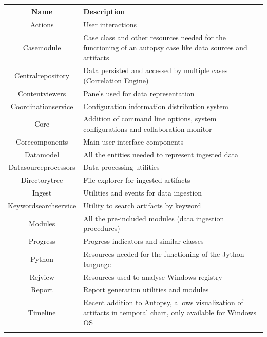 \begin{tabularx}{\textwidth}{@{}|c| *1{>{\centering\arraybackslash}X}@{}|}
    \hline
    \textbf{Name} & \textbf{Description} \\
    \hline\hline
    Actions & User interactions  \\
    \hline
    Casemodule & Case class and other resources needed for the functioning of an autopsy case like data sources and artifacts \\
    \hline
    Centralrepository & Data persisted and accessed by multiple cases (Correlation Engine) \\
    \hline
    Contentviewers & Panels used for data representation  \\
    \hline
    Coordinationservice & Configuration information distribution system \\
    \hline
    Core & Addition of command line options, system configurations and collaboration monitor  \\
    \hline
    Corecomponents & Main user interface components \\
    \hline
    Datamodel & All the entities needed to represent ingested data \\
    \hline
    Datasourceprocessors & Data processing utilities  \\
    \hline
    Directorytree & File explorer for ingested artifacts \\
    \hline
    Ingest & Utilities and events for data ingestion  \\
    \hline
    Keywordsearchservice & Utility to search artifacts by keyword  \\
    \hline
    Modules & All the pre-included modules (data ingestion procedures) \\
    \hline
    Progress & Progress indicators and similar classes \\
    \hline
    Python & Resources needed for the functioning of the Jython language \\
    \hline
    Rejview & Resources used to analyse Windows registry \\
    \hline
    Report & Report generation utilities and modules \\
    \hline
    Timeline & Recent addition to Autopsy, allows visualization of artifacts in temporal chart, only available for Windows OS \\
    \hline
    \caption{Autopsy Modules Overview}
    \label{tab:autopsyOverview}
\end{tabularx}

